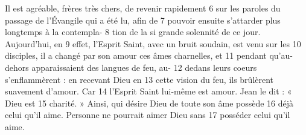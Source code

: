 Il est agréable, frères très chers, de revenir rapidement	 
6	 	sur les paroles du passage de l'Évangile qui a été lu, afin de	 
7	 	pouvoir ensuite s'attarder plus longtemps à la contempla-	 
8	 	tion de la si grande solennité de ce jour. Aujourd'hui, en	 
9	 	effet, l'Esprit Saint, avec un bruit soudain, est venu sur les	 
10	 	disciples, il a changé par son amour ces âmes charnelles, et	 
11	 	pendant qu'au-dehors apparaissaient des langues de feu, au-	 
12	 	dedans leurs coeurs s'enflammèrent : en recevant Dieu en	 
13	 	cette vision du feu, ils brûlèrent suavement d'amour. Car	 
14	 	l'Esprit Saint lui-même est amour. Jean le dit : « Dieu est	 
15	 	charité. » Ainsi, qui désire Dieu de toute son âme possède	 
16	 	déjà celui qu'il aime. Personne ne pourrait aimer Dieu sans	 
17	 	posséder celui qu'il aime.
